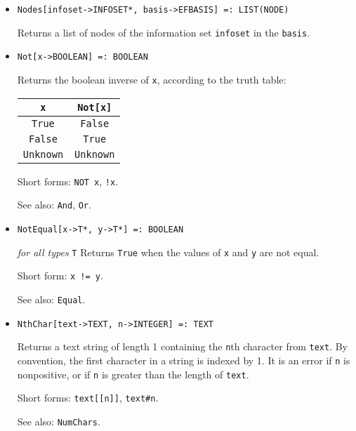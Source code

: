 \begin{itemize}
\item{}
\protect \large \begin{verbatim}
Nodes[infoset->INFOSET*, basis->EFBASIS] =: LIST(NODE) 
\end{verbatim}\normalsize

\bd
Returns a list of nodes of the information set \verb+infoset+ in the
\verb+basis+.  
\ed

\item{}
\protect \large \begin{verbatim}
Not[x->BOOLEAN] =: BOOLEAN 
\end{verbatim}\normalsize

\bd
Returns the boolean inverse of \verb+x+, according to the truth table:
\begin{center}
\begin{tabular}{|c|c|}  \hline
\verb+x+ & \verb+Not[x]+ \\ \hline
\verb+True+ & \verb+False+ \\
\verb+False+ & \verb+True+ \\
\verb+Unknown+ & \verb+Unknown+ \\ \hline
\end{tabular}
\end{center}

\item [Short forms:] \verb+NOT x+, \verb+!x+.
\item [See also:] \verb+And+, \verb+Or+.
\ed

\item{}
\protect \large \begin{verbatim}
NotEqual[x->T*, y->T*] =: BOOLEAN
\end{verbatim}\normalsize

{\it for all types} {\tt T}
\bd
Returns \verb+True+ when the values of \verb+x+ and \verb+y+ are
not equal.
\item [Short form:] \verb+x != y+.
\item [See also:] \verb+Equal+.
\ed

\item{}
\protect \large \begin{verbatim}
NthChar[text->TEXT, n->INTEGER] =: TEXT 
\end{verbatim}\normalsize

\bd
Returns a text string of length 1 containing the \verb+n+th
character from \verb+text+.  By convention, the first character
in a string is indexed by 1.  It is an error if \verb+n+ is nonpositive,
or if \verb+n+ is greater than the length of \verb+text+.
\item [Short forms:] \verb+text[[n]]+, \verb+text#n+.
\item [See also:] \verb+NumChars+.
\ed


\end{itemize}
